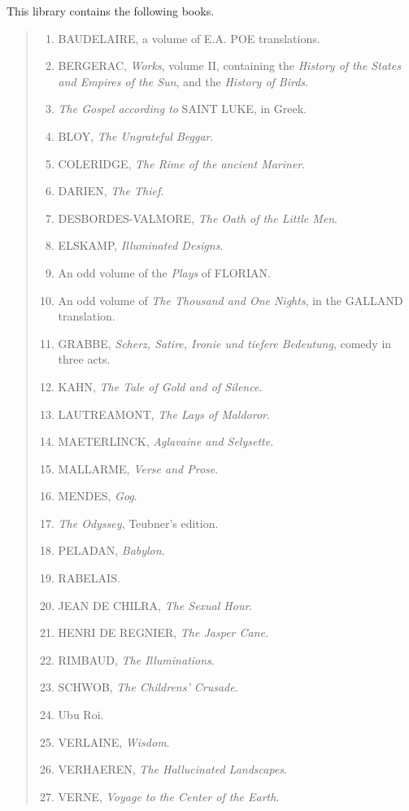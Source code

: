 This library contains the following books.

\begin{quotation}
  \begin{enumerate}
    \item BAUDELAIRE, a volume of E.A. POE translations.
    \item BERGERAC, \textit{Works}, volume II, containing the \textit{History of the States and Empires of the Sun}, and the \textit{History of Birds}.
    \item \textit{The Gospel according to} SAINT LUKE, in Greek.
    \item BLOY, \textit{The Ungrateful Beggar}.
    \item COLERIDGE, \textit{The Rime of the ancient Mariner}.
    \item DARIEN, \textit{The Thief}.
    \item DESBORDES-VALMORE, \textit{The Oath of the Little Men}.
    \item ELSKAMP, \textit{Illuminated Designs}.
    \item An odd volume of the \textit{Plays} of FLORIAN\@.
    \item An odd volume of \textit{The Thousand and One Nights}, in the GALLAND translation.
    \item GRABBE, \textit{Scherz, Satire, Ironie und tiefere Bedeutung}, comedy in three acts.
    \item KAHN, \textit{The Tale of Gold and of Silence}.
    \item LAUTREAMONT, \textit{The Lays of Maldoror}.
    \item MAETERLINCK, \textit{Aglavaine and Selysette}.
    \item MALLARME, \textit{Verse and Prose}.
    \item MENDES, \textit{Gog}.
    \item \textit{The Odyssey}, Teubner's edition.
    \item PELADAN, \textit{Babylon}.
    \item RABELAIS\@.
    \item JEAN DE CHILRA, \textit{The Sexual Hour}.
    \item HENRI DE REGNIER, \textit{The Jasper Cane}.
    \item RIMBAUD, \textit{The Illuminations}.
    \item SCHWOB, \textit{The Childrens' Crusade}.
    \item Ubu Roi.
    \item VERLAINE, \textit{Wisdom}.
    \item VERHAEREN, \textit{The Hallucinated Landscapes}.
    \item VERNE, \textit{Voyage to the Center of the Earth}.
  \end{enumerate}
\end{quotation}

